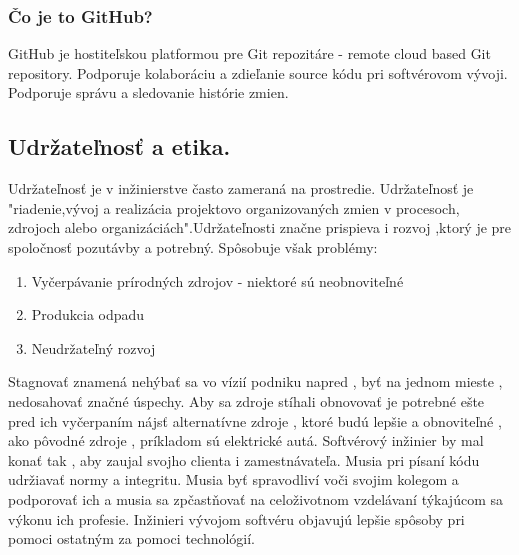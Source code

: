 \documentclass[10pt,oneside,slovak,a4paper]{article}
\begin{document}
\subsubsection{Čo je to GitHub?}
GitHub je hostiteľskou platformou pre Git repozitáre - remote cloud based Git repository. Podporuje kolaboráciu a  zdieľanie source kódu pri softvérovom vývoji. Podporuje správu a sledovanie histórie zmien.
\subsection{Udržateľnosť a etika.}
Udržateľnosť je v inžinierstve často zameraná na prostredie. Udržateľnosť je "riadenie,vývoj a realizácia projektovo organizovaných zmien v procesoch, zdrojoch alebo organizáciách".Udržateľnosti značne prispieva i rozvoj ,ktorý je pre spoločnosť pozutávby a potrebný. Spôsobuje však problémy:
\begin{enumerate}
    \item{Vyčerpávanie prírodných zdrojov - niektoré sú neobnoviteľné}
    \item{Produkcia odpadu}
    \item{Neudržateľný rozvoj}
\end{enumerate}
Stagnovať znamená nehýbať sa vo vízií podniku napred , byť na jednom mieste , nedosahovať značné úspechy.
Aby sa zdroje stíhali obnovovať je potrebné ešte pred ich vyčerpaním nájsť alternatívne zdroje , ktoré budú lepšie a obnoviteľné , ako pôvodné zdroje , príkladom sú elektrické autá.
Softvérový inžinier by mal konať tak , aby zaujal svojho clienta i zamestnávateľa. Musia pri písaní kódu udržiavať normy a integritu. Musia byť spravodliví voči svojim kolegom a podporovať ich a musia sa zpčastňovať na celoživotnom vzdelávaní týkajúcom sa výkonu ich profesie. Inžinieri vývojom softvéru objavujú lepšie spôsoby pri pomoci ostatným za pomoci technológií.
\newpage

\end{document}
